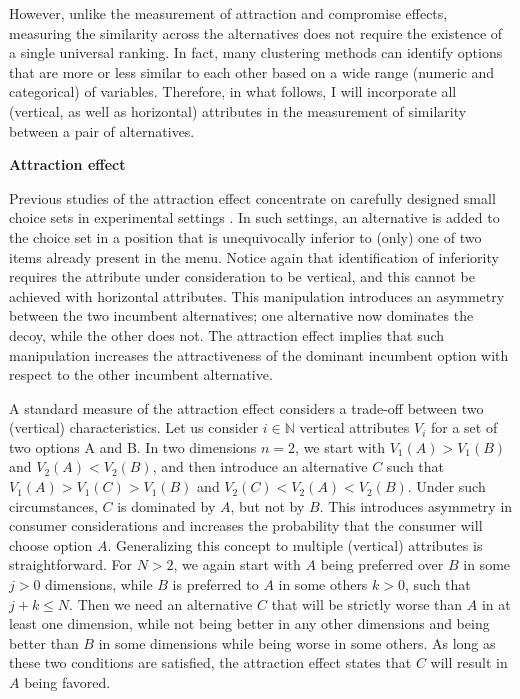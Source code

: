 \documentclass[a4paper,12pt]{article}
\begin{document}
However, unlike the measurement of attraction and compromise effects, measuring the similarity across the alternatives does not require the existence of a single universal ranking. In fact, many clustering methods can identify options that are more or less similar to each other based on a wide range (numeric and categorical) of variables. Therefore, in what follows, I will incorporate all (vertical, as well as horizontal) attributes in the measurement of similarity between a pair of alternatives.

\textbf{Attraction effect}

Previous studies of the attraction effect concentrate on carefully designed small choice sets in experimental settings \citep{huberEtAl82, huberPuto83}. In such settings, an alternative is added to the choice set in a position that is unequivocally inferior to (only) one of two items already present in the menu. Notice again that identification of inferiority requires the attribute under consideration to be vertical, and this cannot be achieved with horizontal attributes. This manipulation introduces an asymmetry between the two incumbent alternatives; one alternative now dominates the decoy, while the other does not. The attraction effect implies that such manipulation increases the attractiveness of the dominant incumbent option with respect to the other incumbent alternative. 

A standard measure of the attraction effect considers a trade-off between two (vertical) characteristics. Let us consider $i \in \mathbb{N}$ vertical attributes $V_i$ for a set of two options A and B. In two dimensions $n = 2$, we start with $V_1(A) > V_1(B)$ and $V_2(A) < V_2(B)$, and then introduce an alternative $C$ such that $V_1(A) > V_1(C) > V_1(B)$ and $V_2(C) < V_2(A) < V_2(B)$. Under such circumstances, $C$ is dominated by $A$, but not by $B$. This introduces asymmetry in consumer considerations and increases the probability that the consumer will choose option $A$. Generalizing this concept to multiple (vertical) attributes is straightforward. For $N > 2$, we again start with $A$ being preferred over $B$ in some $j > 0$ dimensions, while $B$ is preferred to $A$ in some others $k > 0$, such that $j+k \le N$. Then we need an alternative $C$ that will be strictly worse than $A$ in at least one dimension, while not being better in any other dimensions and being better than $B$ in some dimensions while being worse in some others. As long as these two conditions are satisfied, the attraction effect states that $C$ will result in $A$ being favored. 
\end{document}

